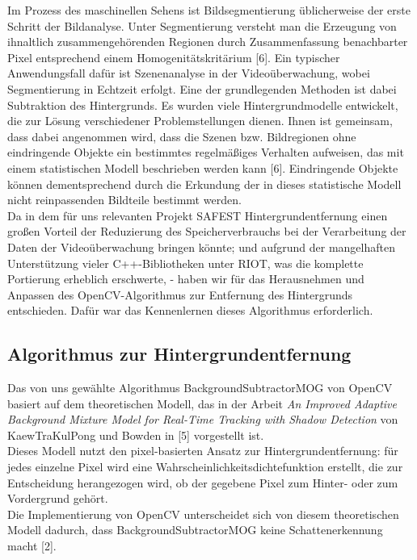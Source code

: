 \documentclass[10pt,a4paper]{article}
\begin{document}
Im Prozess des maschinellen Sehens ist Bildsegmentierung üblicherweise der erste Schritt der Bildanalyse. Unter Segmentierung versteht man die Erzeugung von ihnaltlich zusammengehörenden Regionen durch Zusammenfassung benachbarter Pixel entsprechend einem Homogenitätskritärium [6]. Ein typischer Anwendungsfall dafür ist Szenenanalyse in der Videoüberwachung, wobei Segmentierung in Echtzeit erfolgt. Eine der grundlegenden Methoden ist dabei Subtraktion des Hintergrunds. Es wurden viele Hintergrundmodelle entwickelt, die zur Lösung verschiedener Problemstellungen dienen. Ihnen ist gemeinsam, dass dabei angenommen wird, dass die Szenen bzw. Bildregionen ohne eindringende Objekte ein bestimmtes regelmäßiges Verhalten aufweisen, das mit einem statistischen Modell beschrieben werden kann [6]. Eindringende Objekte können dementsprechend durch die Erkundung der in dieses statistische Modell nicht reinpassenden Bildteile bestimmt werden. \\

Da in dem für uns relevanten Projekt SAFEST Hintergrundentfernung einen großen Vorteil der Reduzierung des Speicherverbrauchs bei der Verarbeitung der Daten der Videoüberwachung bringen könnte; und aufgrund der mangelhaften Unterstützung vieler C++-Bibliotheken unter RIOT, was die komplette Portierung erheblich erschwerte, - haben wir für das Herausnehmen und Anpassen des OpenCV-Algorithmus zur Entfernung des Hintergrunds entschieden. Dafür war das Kennenlernen dieses Algorithmus erforderlich. 

\subsection{Algorithmus zur Hintergrundentfernung}

Das von uns gewählte Algorithmus BackgroundSubtractorMOG von OpenCV basiert auf dem theoretischen Modell, das in der Arbeit {\it An Improved Adaptive Background Mixture Model for Real-Time Tracking with Shadow Detection} von KaewTraKulPong und Bowden in [5] vorgestellt ist. \\

Dieses Modell nutzt den pixel-basierten Ansatz zur Hintergrundentfernung: für jedes einzelne Pixel wird eine Wahrscheinlichkeitsdichtefunktion erstellt, die zur Entscheidung herangezogen wird, ob der gegebene Pixel zum Hinter- oder zum Vordergrund gehört. \\

Die Implementierung von OpenCV unterscheidet sich von diesem theoretischen Modell dadurch, dass BackgroundSubtractorMOG keine Schattenerkennung macht [2]. 
\end{document}
